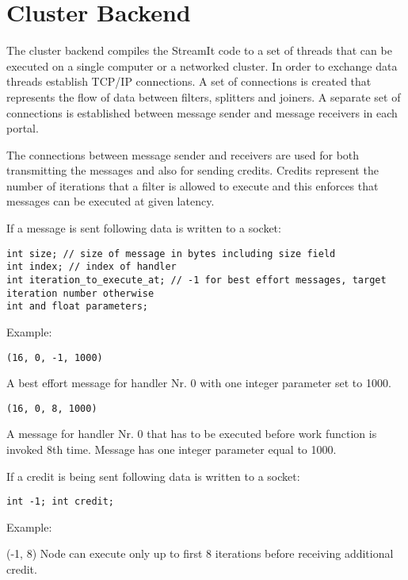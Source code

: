 \section{Cluster Backend}

The cluster backend compiles the StreamIt code to a set of threads
that can be executed on a single computer or a networked cluster. In
order to exchange data threads establish TCP/IP connections. A set of
connections is created that represents the flow of data between
filters, splitters and joiners. A separate set of connections is
established between message sender and message receivers in each
portal.

The connections between message sender and receivers are used for both
transmitting the messages and also for sending credits. Credits
represent the number of iterations that a filter is allowed to execute
and this enforces that messages can be executed at given latency.

If a message is sent following data is written to a socket:

{\scriptsize
\begin{verbatim}
int size; // size of message in bytes including size field
int index; // index of handler
int iteration_to_execute_at; // -1 for best effort messages, target iteration number otherwise
int and float parameters;
\end{verbatim}}

Example:

{\scriptsize
\begin{verbatim}
(16, 0, -1, 1000)
\end{verbatim}}

A best effort message for handler Nr. 0 with one integer parameter set
to 1000.

{\scriptsize
\begin{verbatim}
(16, 0, 8, 1000)
\end{verbatim}}

A message for handler Nr. 0 that has to be executed before work
function is invoked 8th time. Message has one integer parameter equal
to 1000.

If a credit is being sent following data is written to a socket:

{\scriptsize
\begin{verbatim}
int -1; int credit; 
\end{verbatim}}

Example:

(-1, 8) Node can execute only up to first 8 iterations before receiving additional credit.

